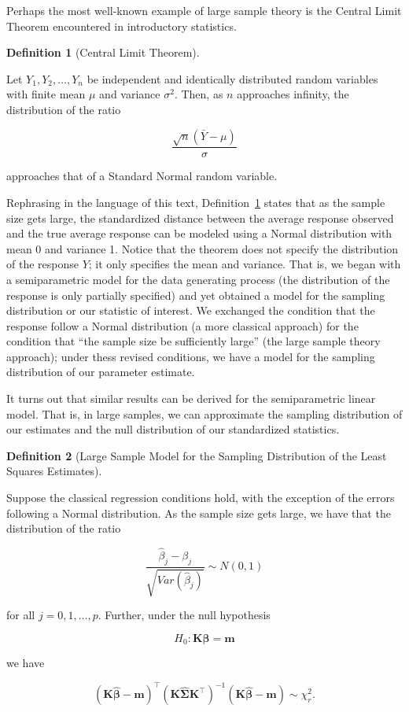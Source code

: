 \documentclass[
  letterpaper,
  DIV=11,
  numbers=noendperiod]{scrreprt}
\theoremstyle{definition}
\newtheorem{definition}{Definition}[chapter]
\theoremstyle{definition}
\theoremstyle{remark}
\begin{document}
Perhaps the most well-known example of large sample theory is the
Central Limit Theorem encountered in introductory statistics.

\begin{definition}[Central Limit
Theorem]\protect\hypertarget{def-clt}{}\label{def-clt}

Let \(Y_1, Y_2, \dotsc, Y_n\) be independent and identically distributed
random variables with finite mean \(\mu\) and variance \(\sigma^2\).
Then, as \(n\) approaches infinity, the distribution of the ratio

\[\frac{\sqrt{n}\left(\bar{Y} - \mu\right)}{\sigma}\]

approaches that of a Standard Normal random variable.

\end{definition}

Rephrasing in the language of this text, Definition~\ref{def-clt} states
that as the sample size gets large, the standardized distance between
the average response observed and the true average response can be
modeled using a Normal distribution with mean 0 and variance 1. Notice
that the theorem does not specify the distribution of the response
\(Y\); it only specifies the mean and variance. That is, we began with a
semiparametric model for the data generating process (the distribution
of the response is only partially specified) and yet obtained a model
for the sampling distribution or our statistic of interest. We exchanged
the condition that the response follow a Normal distribution (a more
classical approach) for the condition that ``the sample size be
sufficiently large'' (the large sample theory approach); under thess
revised conditions, we have a model for the sampling distribution of our
parameter estimate.

It turns out that similar results can be derived for the semiparametric
linear model. That is, in large samples, we can approximate the sampling
distribution of our estimates and the null distribution of our
standardized statistics.

\begin{definition}[Large Sample Model for the Sampling Distribution of
the Least Squares
Estimates]\protect\hypertarget{def-ls-sampling-distribution-large-samples}{}\label{def-ls-sampling-distribution-large-samples}

Suppose the classical regression conditions hold, with the exception of
the errors following a Normal distribution. As the sample size gets
large, we have that the distribution of the ratio

\[\frac{\widehat{\beta}_j - \beta_j}{\sqrt{Var\left(\widehat{\beta}_j\right)}} \sim N(0, 1)\]

for all \(j = 0, 1, \dotsc, p\). Further, under the null hypothesis

\[H_0: \mathbf{K}\boldsymbol{\beta} = \mathbf{m}\]

we have

\[\left(\mathbf{K}\widehat{\boldsymbol{\beta}} - \mathbf{m}\right)^\top \left(\mathbf{K}\widehat{\boldsymbol{\Sigma}}\mathbf{K}^\top\right)^{-1} \left(\mathbf{K}\widehat{\boldsymbol{\beta}} - \mathbf{m}\right) \sim \chi^2_r.\]

\end{definition}
\end{document}
